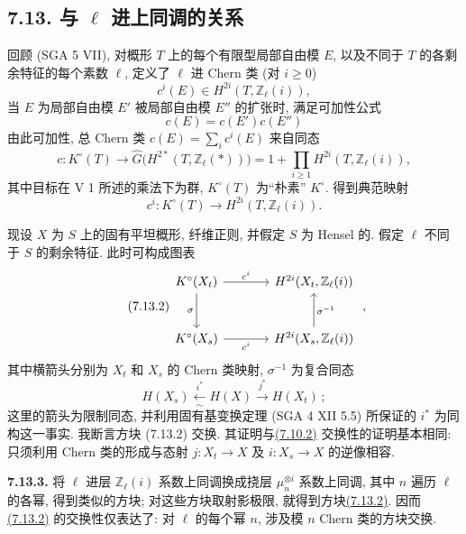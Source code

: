 \subsection*{7.13. 与 $\ell$ 进上同调的关系} 回顾 (SGA 5 VII), 对概形 $T$ 上的每个有限型局部自由模 $E$, 以及不同于 $T$ 的各剩余特征的每个素数 $\ell$, 定义了 $\ell$ 进 Chern 类 (对 $i\geq0$)
%
%
%
\[
c^i(E)\in H^{2i}(T,\mathbb Z_\ell(i)),
\]
当 $E$ 为局部自由模 $E'$ 被局部自由模 $E''$ 的扩张时, 满足可加性公式
\[
c(E)=c(E')c(E'')
\]
由此可加性, 总 Chern 类 $c(E)=\sum_i c^i(E)$ 来自同态
%
%
\begin{equation}\tag{7.13.0}
c:K^\circ(T)\longrightarrow
\widehat G\bigl(H^{2*}(T,\mathbb Z_\ell(*))\bigr)
=1+\prod_{i\geq1}H^{2i}(T,\mathbb Z_\ell(i)),
\end{equation}
其中目标在 V 1 所述的乘法下为群, $K^\circ(T)$ 为“朴素” $K^\circ$. 得到典范映射
%
\begin{equation}\tag{7.13.1}
c^i:K^\circ(T)\longrightarrow H^{2i}(T,\mathbb Z_\ell(i)).
\end{equation}

现设 $X$ 为 $S$ 上的固有平坦概形, 纤维正则, 并假定 $S$ 为 Hensel 的. 假定 $\ell$ 不同于 $S$ 的剩余特征. 此时可构成图表
%
%
\begin{equation}\tag{7.13.2}
\begin{tikzcd}[column sep=large,row sep=large]
K^\circ(X_t) \arrow[r,"c^i"] \arrow[d,"\sigma"'] &
H^{2i}(X_t,\mathbb Z_\ell(i))\\
K^\circ(X_s) \arrow[r,"c^i"'] &
H^{2i}(X_s,\mathbb Z_\ell(i)) \arrow[u,"\sigma^{-1}"']
\end{tikzcd}
\;,
\end{equation}
其中横箭头分别为 $X_t$ 和 $X_s$ 的 Chern 类映射, $\sigma^{-1}$ 为复合同态
%
\[
H(X_s)\xleftarrow[\sim]{i^*}H(X)\xrightarrow{j^*}H(X_t)\,;
\]
这里的箭头为限制同态, 并利用固有基变换定理 (SGA 4 XII 5.5) 所保证的 $i^*$ 为同构这一事实. 我断言方块 (7.13.2) 交换. 其证明与\hyperlink{sga6.e10.eq.7-10-2}{(7.10.2)} 交换性的证明基本相同: 只须利用 Chern 类的形成与态射 $j:X_t\to X$ 及 $i:X_s\to X$ 的逆像相容.
%
%
%
%
%

\textbf{7.13.3.} 将 $\ell$ 进层 $\mathbb Z_\ell(i)$ 系数上同调换成挠层 $\mu_n^{\otimes i}$ 系数上同调, 其中 $n$ 遍历 $\ell$ 的各幂, 得到类似的方块; 对这些方块取射影极限, 就得到方块\hyperlink{sga6.e10.eq.7-13-2}{(7.13.2)}. 因而\hyperlink{sga6.e10.eq.7-13-2}{(7.13.2)} 的交换性仅表达了: 对 $\ell$ 的每个幂 $n$, 涉及模 $n$ Chern 类的方块交换.
%
%
%
%
%
%
%

